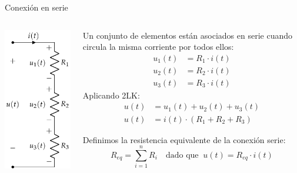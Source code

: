\documentclass[aspectratio=169, xcolor={usenames,svgnames,dvipsnames}]{beamer}
\begin{document}
\begin{frame}{Conexión en serie}
    \begin{columns}
    \begin{column}{0.3\columnwidth}
        \begin{center}
        \includegraphics[height=0.85\textheight]{../figs/AsociacionSerie.pdf}
        \end{center}
    \end{column}
    \begin{column}{0.7\columnwidth}
        Un conjunto de elementos están asociados en serie cuando circula la \alert{misma corriente} por todos ellos:
        \begin{align*}      
          u_1(t) &= R_1 \cdot i(t)\\
          u_2(t) &= R_2 \cdot i(t)\\
          u_3(t) &= R_3 \cdot i(t)      
        \end{align*}    
        Aplicando \alert{2LK}:
        \begin{align*} 
            u(t) &= u_1(t) + u_2(t) + u_3(t) \\
            u(t) &= i(t) \cdot (R_1 + R_2 + R_3)
        \end{align*}    
    
        Definimos la \alert{resistencia equivalente} de la conexión serie:
        \[
          \boxed{R_{eq} = \sum_{i = 1}^n R_i} \quad \textrm{dado que} \;\; u(t) = R_{eq} \cdot i(t)
        \]
    \end{column}
    \end{columns}
\end{frame}
\end{document}
